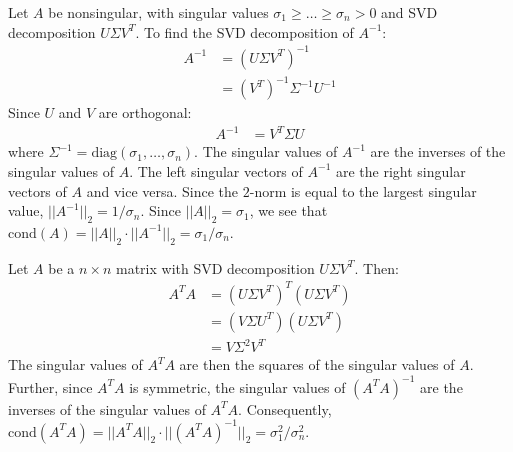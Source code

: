 \documentclass{article}
\begin{document}
\clearpage
\problem{}
Let $A$ be nonsingular, with singular values $\sigma_1 \geq \ldots \geq \sigma_n > 0$ and SVD decomposition $U\Sigma V^T$.
To find the SVD decomposition of $A^{-1}$:
\begin{align*}
    A^{-1} & = {(U\Sigma V^T)}^{-1} \\
    & = {(V^T)}^{-1}\Sigma^{-1} U^{-1}
\end{align*}
Since $U$ and $V$ are orthogonal:
\begin{align*}
    A^{-1} & = V^T\Sigma U
\end{align*}
where $\Sigma^{-1} = \mathrm{diag}(\sigma_1, \ldots, \sigma_n)$.
The singular values of $A^{-1}$ are the inverses of the singular values of $A$. The left singular vectors of $A^{-1}$ are the right singular vectors of $A$ and vice versa.
Since the $2$-norm is equal to the largest singular value, $||A^{-1}||_2 = 1/\sigma_n$.
Since $||A||_2 = \sigma_1$, we see that $\mathrm{cond}(A) = ||A||_2 \cdot ||A^{-1}||_2 = \sigma_1/\sigma_n$.

\clearpage
\problem{}
Let $A$ be a $n \times n$ matrix with SVD decomposition $U\Sigma V^T$. Then:
\begin{align*}
    A^TA & = {(U\Sigma V^T)}^T(U\Sigma V^T) \\
    & = (V\Sigma U^T)(U\Sigma V^T) \\
    & = V\Sigma^2 V^T
\end{align*}
The singular values of $A^TA$ are then the squares of the singular values of $A$. Further, since $A^TA$ is symmetric, the singular values of ${(A^TA)}^{-1}$ are the inverses of the singular values of $A^TA$. Consequently, $\mathrm{cond}(A^TA) = ||A^TA||_2 \cdot ||{(A^TA)}^{-1}||_2 = \sigma_1^2/\sigma_n^2$.
\end{document}
